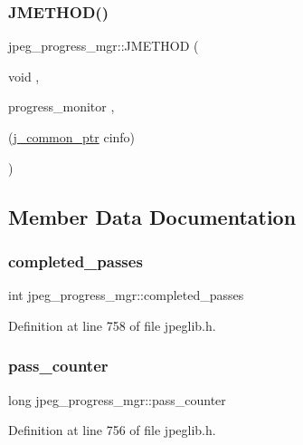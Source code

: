 \subsubsection{\texorpdfstring{JMETHOD()}{JMETHOD()}}
{\footnotesize\ttfamily jpeg\+\_\+progress\+\_\+mgr\+::\+J\+M\+E\+T\+H\+OD (\begin{DoxyParamCaption}\item[{void}]{,  }\item[{progress\+\_\+monitor}]{,  }\item[{(\mbox{\hyperlink{jpeglib_8h_a1a177ab705cefea8f30ec31a48e62650}{j\+\_\+common\+\_\+ptr}} cinfo)}]{ }\end{DoxyParamCaption})}



\subsection{Member Data Documentation}
\mbox{\label{structjpeg__progress__mgr_a0cf4c1c84b2662763053e0eeaca417f3}} 
\subsubsection{\texorpdfstring{completed\_passes}{completed\_passes}}
{\footnotesize\ttfamily int jpeg\+\_\+progress\+\_\+mgr\+::completed\+\_\+passes}



Definition at line 758 of file jpeglib.\+h.

\mbox{\label{structjpeg__progress__mgr_ae52d1c89154d3f15ea44f96ee1c4ea7f}} 
\subsubsection{\texorpdfstring{pass\_counter}{pass\_counter}}
{\footnotesize\ttfamily long jpeg\+\_\+progress\+\_\+mgr\+::pass\+\_\+counter}



Definition at line 756 of file jpeglib.\+h.

\mbox{\label{structjpeg__progress__mgr_a68ec6ba74838f7b2b8ded8d4c8254c1d}} 
